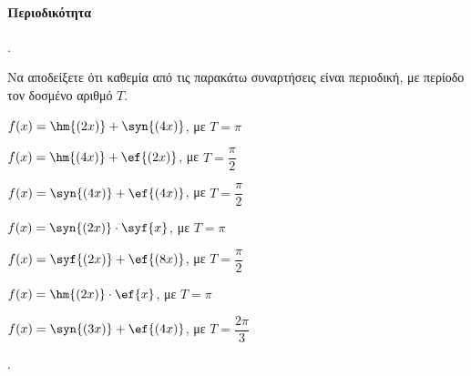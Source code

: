 \documentclass[11pt,a4paper,twocolumn]{article}
\newcounter{askhsh}
\newcommand{\askhsh}{\large\theaskhsh.\ \addtocounter{askhsh}{1}}
\begin{document}
\paragraph{Περιοδικότητα}
\askhsh Να αποδείξετε ότι καθεμία από τις παρακάτω συναρτήσεις είναι περιοδική, με περίοδο τον δοσμένο αριθμό $T$.
\begin{alist}
\item $f(x)=\hm{(2x)}+\syn{(4x)}$, με $T=\pi$
\item $f(x)=\hm{(4x)}+\ef{(2x)}$, με $T=\dfrac{\pi}{2}$
\item $f(x)=\syn{(4x)}+\ef{(4x)}$, με $T=\dfrac{\pi}{2}$
\item $f(x)=\syn{(2x)}\cdot\syf{x}$, με $T=\pi$
\item $f(x)=\syf{(2x)}+\ef{(8x)}$, με $T=\dfrac{\pi}{2}$
\item $f(x)=\hm{(2x)}\cdot\ef{x}$, με $T=\pi$
\item $f(x)=\syn{(3x)}+\ef{(4x)}$, με $T=\dfrac{2\pi}{3}$
\end{alist}
\askhsh
\end{document}
